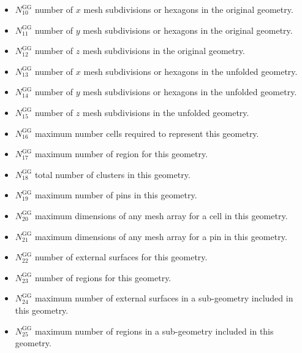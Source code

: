 \begin{itemize}
\item $N^{\text{GG}}_{10}$ number of $x$ mesh subdivisions or hexagons in the original geometry.
\item $N^{\text{GG}}_{11}$ number of $y$ mesh subdivisions or hexagons in the original geometry.
\item $N^{\text{GG}}_{12}$ number of $z$ mesh subdivisions in the original geometry.
\item $N^{\text{GG}}_{13}$ number of $x$ mesh subdivisions or hexagons in the unfolded geometry.
\item $N^{\text{GG}}_{14}$ number of $y$ mesh subdivisions or hexagons in the unfolded geometry.
\item $N^{\text{GG}}_{15}$ number of $z$ mesh subdivisions in the unfolded geometry.
\item $N^{\text{GG}}_{16}$ maximum number cells required to represent this geometry.
\item $N^{\text{GG}}_{17}$ maximum number of region for this geometry.
\item $N^{\text{GG}}_{18}$ total number of clusters in this geometry.
\item $N^{\text{GG}}_{19}$ maximum number of pins in this geometry.
\item $N^{\text{GG}}_{20}$ maximum dimensions of any mesh array for a cell in this geometry.
\item $N^{\text{GG}}_{21}$ maximum dimensions of any mesh array for a pin in this geometry. 
\item $N^{\text{GG}}_{22}$ number of external surfaces for this geometry.
\item $N^{\text{GG}}_{23}$ number of regions for this geometry.
\item $N^{\text{GG}}_{24}$ maximum number of external surfaces in a sub-geometry included in this geometry.
\item $N^{\text{GG}}_{25}$ maximum number of regions in a sub-geometry included in this geometry.
\end{itemize}

